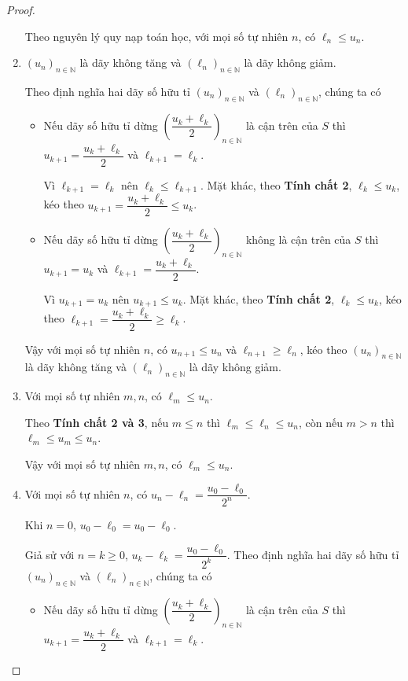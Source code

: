 \begin{proof}
\begin{enumerate}[label={\textbf{Tính chất \arabic*.}},itemindent=1.7cm]
              Theo nguyên lý quy nạp toán học, với mọi số tự nhiên $n$, có $\ell_{n}\leq u_{n}$.
        \item ${(u_{n})}_{n\in\mathbb{N}}$ là dãy không tăng và ${(\ell_{n})}_{n\in\mathbb{N}}$ là dãy không giảm.

              Theo định nghĩa hai dãy số hữu tỉ ${(u_{n})}_{n\in\mathbb{N}}$ và ${(\ell_{n})}_{n\in\mathbb{N}}$, chúng ta có
              \begin{itemize}
                  \item Nếu dãy số hữu tỉ dừng ${\left(\dfrac{u_{k}+\ell_{k}}{2}\right)}_{n\in\mathbb{N}}$ là cận trên của $S$ thì $u_{k+1} = \dfrac{u_{k} + \ell_{k}}{2}$ và $\ell_{k+1} = \ell_{k}$.

                        Vì $\ell_{k+1} = \ell_{k}$ nên $\ell_{k}\leq \ell_{k+1}$. Mặt khác, theo \textbf{Tính chất 2}, $\ell_{k}\leq u_{k}$, kéo theo $u_{k+1} = \dfrac{u_{k} + \ell_{k}}{2}\leq u_{k}$.
                  \item Nếu dãy số hữu tỉ dừng ${\left(\dfrac{u_{k}+\ell_{k}}{2}\right)}_{n\in\mathbb{N}}$ không là cận trên của $S$ thì $u_{k+1} = u_{k}$ và $\ell_{k+1} = \dfrac{u_{k} + \ell_{k}}{2}$.

                        Vì $u_{k+1} = u_{k}$ nên $u_{k+1}\leq u_{k}$. Mặt khác, theo \textbf{Tính chất 2}, $\ell_{k}\leq u_{k}$, kéo theo $\ell_{k+1} = \dfrac{u_{k} + \ell_{k}}{2}\geq \ell_{k}$.
              \end{itemize}

              Vậy với mọi số tự nhiên $n$, có $u_{n+1}\leq u_{n}$ và $\ell_{n+1}\geq \ell_{n}$, kéo theo ${(u_{n})}_{n\in\mathbb{N}}$ là dãy không tăng và ${(\ell_{n})}_{n\in\mathbb{N}}$ là dãy không giảm.
        \item Với mọi số tự nhiên $m, n$, có $\ell_{m}\leq u_{n}$.

              Theo \textbf{Tính chất 2 và 3}, nếu $m\leq n$ thì $\ell_{m}\leq \ell_{n}\leq u_{n}$, còn nếu $m > n$ thì $\ell_{m}\leq u_{m}\leq u_{n}$.

              Vậy với mọi số tự nhiên $m, n$, có $\ell_{m}\leq u_{n}$.
        \item Với mọi số tự nhiên $n$, có $u_{n} - \ell_{n} = \dfrac{u_{0} - \ell_{0}}{2^{n}}$.

              Khi $n = 0$, $u_{0} - \ell_{0} = u_{0} - \ell_{0}$.

              Giả sử với $n = k\geq 0$, $u_{k} - \ell_{k} = \dfrac{u_{0} - \ell_{0}}{2^{k}}$. Theo định nghĩa hai dãy số hữu tỉ ${(u_{n})}_{n\in\mathbb{N}}$ và ${(\ell_{n})}_{n\in\mathbb{N}}$, chúng ta có
              \begin{itemize}
                  \item Nếu dãy số hữu tỉ dừng ${\left(\dfrac{u_{k}+\ell_{k}}{2}\right)}_{n\in\mathbb{N}}$ là cận trên của $S$ thì $u_{k+1} = \dfrac{u_{k} + \ell_{k}}{2}$ và $\ell_{k+1} = \ell_{k}$.


\end{itemize}
\end{enumerate}
\end{proof}
